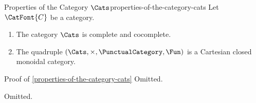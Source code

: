 \begin{proposition}{Properties of the Category $\Cats$}{properties-of-the-category-cats}%
    Let $\CatFont{C}$ be a category.
    \begin{enumerate}
        \item\label{properties-of-the-category-cats-co-completeness}The category $\Cats$ is complete and cocomplete.%
        \item\label{properties-of-the-category-cats-cartesian-monoidal-structure}The quadruple $(\Cats,\times,\PunctualCategory,\Fun)$ is a Cartesian closed monoidal category.
    \end{enumerate}
\end{proposition}
\begin{Proof}{Proof of \cref{properties-of-the-category-cats}}%
    Omitted.

    Omitted.
\end{Proof}
